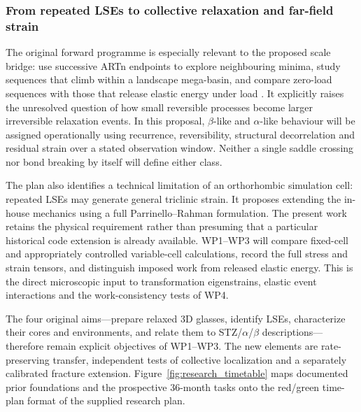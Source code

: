 \documentclass[11pt,a4paper]{article}
\begin{document}
\subsubsection{From repeated LSEs to collective relaxation and far-field strain}
The original forward programme is especially relevant to the proposed scale bridge: use successive ARTn endpoints to explore neighbouring minima, study sequences that climb within a landscape mega-basin, and compare zero-load sequences with those that release elastic energy under load \cite{swayplan}. It explicitly raises the unresolved question of how small reversible processes become larger irreversible relaxation events. In this proposal, $\beta$-like and $\alpha$-like behaviour will be assigned operationally using recurrence, reversibility, structural decorrelation and residual strain over a stated observation window. Neither a single saddle crossing nor bond breaking by itself will define either class.

The plan also identifies a technical limitation of an orthorhombic simulation cell: repeated LSEs may generate general triclinic strain. It proposes extending the in-house mechanics using a full Parrinello--Rahman formulation. The present work retains the physical requirement rather than presuming that a particular historical code extension is already available. WP1--WP3 will compare fixed-cell and appropriately controlled variable-cell calculations, record the full stress and strain tensors, and distinguish imposed work from released elastic energy. This is the direct microscopic input to transformation eigenstrains, elastic event interactions and the work-consistency tests of WP4.

The four original aims---prepare relaxed 3D glasses, identify LSEs, characterize their cores and environments, and relate them to STZ/$\alpha$/$\beta$ descriptions---therefore remain explicit objectives of WP1--WP3. The new elements are rate-preserving transfer, independent tests of collective localization and a separately calibrated fracture extension. Figure~\ref{fig:research_timetable} maps documented prior foundations and the prospective 36-month tasks onto the red/green time-plan format of the supplied research plan. 
\end{document}
